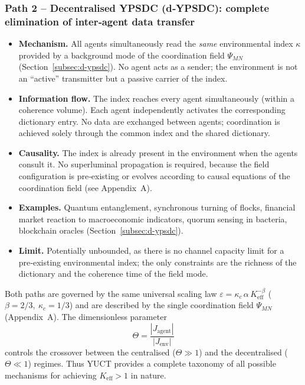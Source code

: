 \documentclass[11pt,a4paper]{article}
\begin{document}
\subsubsection*{Path 2 – Decentralised YPSDC (d‑YPSDC): complete elimination of inter‑agent data transfer}
\begin{itemize}[leftmargin=*]
	\item \textbf{Mechanism.} All agents simultaneously read the \emph{same}
	environmental index \(\kappa\) provided by a background mode of the
	coordination field \(\Psi_{MN}\) (Section~\ref{subsec:d-ypsdc}). No agent
	acts as a sender; the environment is not an ``active'' transmitter but a
	passive carrier of the index.
	\item \textbf{Information flow.} The index reaches every agent
	simultaneously (within a coherence volume). Each agent independently
	activates the corresponding dictionary entry. No data are exchanged
	between agents; coordination is achieved solely through the common index
	and the shared dictionary.
	\item \textbf{Causality.} The index is already present in the environment
	when the agents consult it. No superluminal propagation is required,
	because the field configuration is pre‑existing or evolves according to
	causal equations of the coordination field (see Appendix~A).
	\item \textbf{Examples.} Quantum entanglement, synchronous turning of
	flocks, financial market reaction to macroeconomic indicators, quorum
	sensing in bacteria, blockchain oracles (Section~\ref{subsec:d-ypsdc}).
	\item \textbf{Limit.} Potentially unbounded, as there is no channel
	capacity limit for a pre‑existing environmental index; the only
	constraints are the richness of the dictionary and the coherence time
	of the field mode.
\end{itemize}

\medskip
\noindent
Both paths are governed by the same universal scaling law
\(\varepsilon = \kappa_c \, \alpha \, K_{\mathrm{eff}}^{-\beta}\)
(\(\beta = 2/3,\ \kappa_c = 1/3\)) and are described by the single
coordination field \(\Psi_{MN}\) (Appendix~A). The dimensionless parameter
\[
\Theta = \frac{|J_{\mathrm{agent}}|}{|J_{\mathrm{env}}|}
\]
controls the crossover between the centralised (\(\Theta \gg 1\)) and the
decentralised (\(\Theta \ll 1\)) regimes. Thus YUCT provides a complete
taxonomy of all possible mechanisms for achieving \(K_{\mathrm{eff}} > 1\)
in nature.
\end{document}
